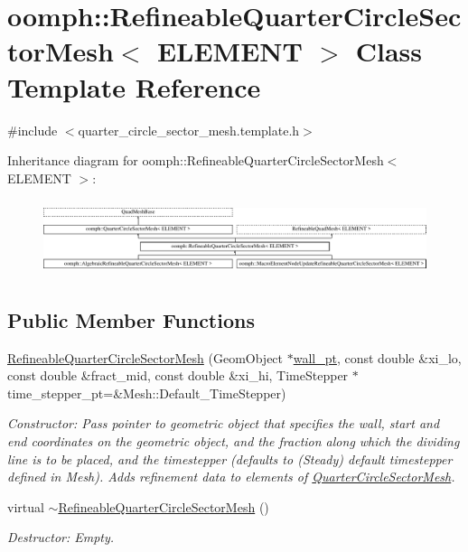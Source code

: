 \hypertarget{classoomph_1_1RefineableQuarterCircleSectorMesh}{}\section{oomph\+:\+:Refineable\+Quarter\+Circle\+Sector\+Mesh$<$ E\+L\+E\+M\+E\+NT $>$ Class Template Reference}
\label{classoomph_1_1RefineableQuarterCircleSectorMesh}


{\ttfamily \#include $<$quarter\+\_\+circle\+\_\+sector\+\_\+mesh.\+template.\+h$>$}

Inheritance diagram for oomph\+:\+:Refineable\+Quarter\+Circle\+Sector\+Mesh$<$ E\+L\+E\+M\+E\+NT $>$\+:\begin{figure}[H]
\begin{center}
\leavevmode
\includegraphics[height=2.235529cm]{classoomph_1_1RefineableQuarterCircleSectorMesh}
\end{center}
\end{figure}
\subsection*{Public Member Functions}
\begin{DoxyCompactItemize}
\item 
\hyperlink{classoomph_1_1RefineableQuarterCircleSectorMesh_a07b183ff3e548456e67b92b6fce41cde}{Refineable\+Quarter\+Circle\+Sector\+Mesh} (Geom\+Object $\ast$\hyperlink{classoomph_1_1QuarterCircleSectorMesh_a0b03071bbe7e95cc6723c221ddc0998a}{wall\+\_\+pt}, const double \&xi\+\_\+lo, const double \&fract\+\_\+mid, const double \&xi\+\_\+hi, Time\+Stepper $\ast$time\+\_\+stepper\+\_\+pt=\&Mesh\+::\+Default\+\_\+\+Time\+Stepper)
\begin{DoxyCompactList}\small\item\em Constructor\+: Pass pointer to geometric object that specifies the wall, start and end coordinates on the geometric object, and the fraction along which the dividing line is to be placed, and the timestepper (defaults to (Steady) default timestepper defined in Mesh). Adds refinement data to elements of \hyperlink{classoomph_1_1QuarterCircleSectorMesh}{Quarter\+Circle\+Sector\+Mesh}. \end{DoxyCompactList}\item 
virtual \hyperlink{classoomph_1_1RefineableQuarterCircleSectorMesh_abf958060ab5ea27a2ca079cba58af8f5}{$\sim$\+Refineable\+Quarter\+Circle\+Sector\+Mesh} ()
\begin{DoxyCompactList}\small\item\em Destructor\+: Empty. \end{DoxyCompactList}\end{DoxyCompactItemize}
